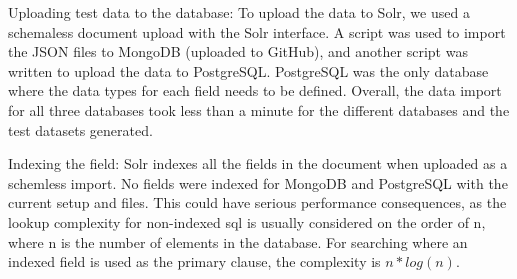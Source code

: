   Uploading test data to the database: To upload the data to Solr, we used a
  schemaless document upload with the Solr interface. A script was used to
  import the JSON files to MongoDB (uploaded to GitHub), and another script was
  written to upload the data to PostgreSQL. PostgreSQL was the only database
  where the data types for each field needs to be defined. Overall, the data
  import for all three databases took less than a minute for the different
  databases and the test datasets generated.

  Indexing the field: Solr indexes all the fields in the document when uploaded
  as a schemless import. No fields were indexed for MongoDB and PostgreSQL with
  the current setup and files. This could have serious performance
  consequences, as the lookup complexity for non-indexed sql is usually
  considered on the order of n, where n is the number of elements in the
  database. For searching where an indexed field is used as the primary clause,
  the complexity is $n * log(n)$.











